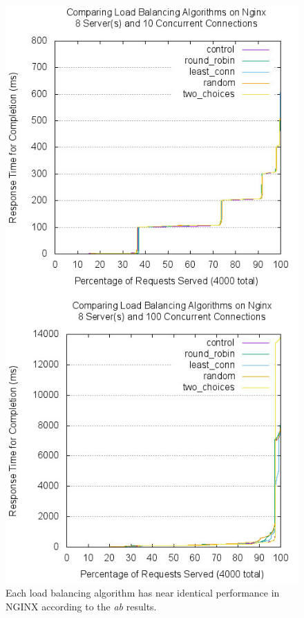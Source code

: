 \begin{figure}
  \includegraphics[width=\linewidth]{figures/ab/nginx/nginx-8.jpg}
  \caption{Each load balancing algorithm has near identical
    performance in NGINX according to the \textit{ab} results.}
\label{fig:nginx1}
\end{figure}

